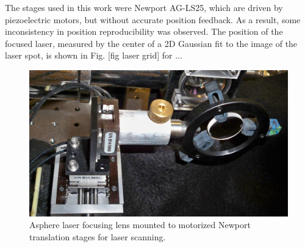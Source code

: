 The stages used in this work were Newport AG-LS25, which are driven by piezoelectric motors, but without accurate position feedback.  As a result, some inconsistency in position reproducibility was observed.  The position of the focused laser, measured by the center of a 2D Gaussian fit to the image of the laser spot, is shown in Fig. [fig laser grid] for ...


\begin{figure} %
        \centering
                \includegraphics[width=.5\textwidth]{figures/stages_2.JPG}
                \caption{Asphere laser focusing lens mounted to motorized Newport translation stages for laser scanning.}
\label{fig:laserStages}
\end{figure}
